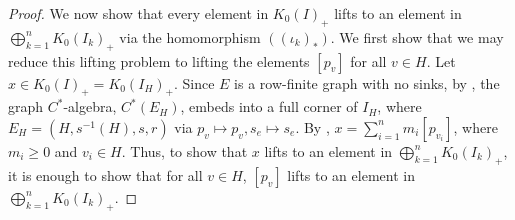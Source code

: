 \documentclass[12pt]{amsbook}%
\newcommand{\abknotation}[1]{\left(#1\right)}
\theoremstyle{defin}
\theoremstyle{remark}
\numberwithin{equation}{chapter}
\numberwithin{theor}{section}
\begin{document}
\begin{proof}
We now show that every element in $K_0(I)_+$ lifts to an element in $\bigoplus_{k=1}^n K_0(I_k)_+$ via the homomorphism $\abknotation{(\iota_k)_*} $.  We first show that we may reduce this lifting problem to lifting the elements $[p_v]$ for all $v \in H$.  Let $x \in K_0(I)_+ = K_0(I_H)_+$.  Since $E$ is a row-finite graph with no sinks, by \cite[Theorem~4.1]{tbdpirws:crg}, the graph $C^*$-algebra, $C^*(E_H)$, embeds into a full corner of $I_H$, where $E_H = ( H, s^{-1}(H), s, r)$ via $p_{v} \mapsto p_v, s_e \mapsto s_e$.  By \cite[Theorem~7.1]{pamamep:nkga}, $x = \sum_{ i =1}^n m_i [ p_{v_i} ]$, where $m_i \geq 0$ and $v_i \in H$.  Thus, to show that $x$ lifts to an element in $\bigoplus_{k=1}^n K_0(I_k)_+$, it is enough to show that for all $v \in H$, $[p_v]$ lifts to an element in $\bigoplus_{k=1}^n K_0(I_k)_+$.  


\end{proof}
\end{document}
